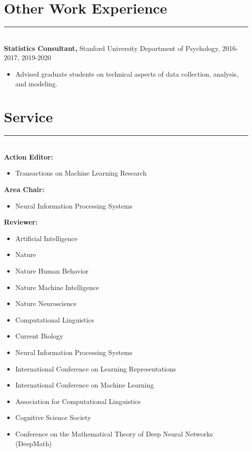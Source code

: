 \documentclass[margin]{res}
\begin{document}
\begin{resume}
{\vspace{1pt}\section{Other Work Experience} \vspace{-15pt} \rule{\textwidth}{0.5pt} \\[3pt]
{\bf Statistics Consultant,} Stanford University Department of Psychology, 2016-2017, 2019-2020
\begin{itemize} \itemsep -2pt
 \item Advised graduate students on technical aspects of data collection, analysis, and modeling. \end{itemize}
\vspace{1pt}\section{Service} \vspace{-15pt} \rule{\textwidth}{0.5pt} \\[3pt]
{\bf Action Editor:}
\begin{itemize} \itemsep -2pt
 \item Transactions on Machine Learning Research
\end{itemize}
{\bf Area Chair:}
\begin{itemize} \itemsep -2pt
 \item Neural Information Processing Systems 
\end{itemize}
{\bf Reviewer:} 
\begin{itemize} \itemsep -2pt
 \item Artificial Intelligence
 \item Nature
 \item Nature Human Behavior 
 \item Nature Machine Intelligence 
 \item Nature Neuroscience 
 \item Computational Linguistics
 \item Current Biology 
 \item Neural Information Processing Systems
 \item International Conference on Learning Representations 
 \item International Conference on Machine Learning
 \item Association for Computational Linguistics
 \item Cognitive Science Society
 \item Conference on the Mathematical Theory of Deep Neural Networks (DeepMath)

\end{itemize}}
\end{resume}
\end{document}
